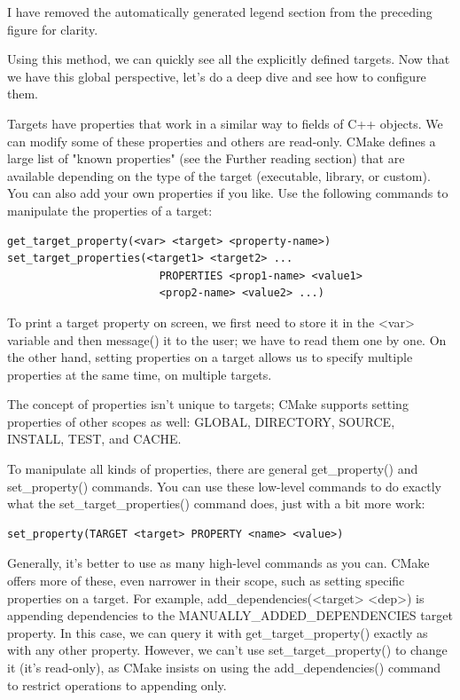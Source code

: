 I have removed the automatically generated legend section from the preceding figure for clarity.

Using this method, we can quickly see all the explicitly defined targets. Now that we have this global perspective, let's do a deep dive and see how to configure them.
 

Targets have properties that work in a similar way to fields of C++ objects. We can modify some of these properties and others are read-only. CMake defines a large list of "known properties" (see the Further reading section) that are available depending on the type of the target (executable, library, or custom). You can also add your own properties if you like. Use the following commands to manipulate the properties of a target:

\begin{lstlisting}[style=styleCMake]
get_target_property(<var> <target> <property-name>)
set_target_properties(<target1> <target2> ...
						PROPERTIES <prop1-name> <value1>
						<prop2-name> <value2> ...)
\end{lstlisting}

To print a target property on screen, we first need to store it in the <var> variable and then message() it to the user; we have to read them one by one. On the other hand, setting properties on a target allows us to specify multiple properties at the same time, on multiple targets.

The concept of properties isn't unique to targets; CMake supports setting properties of other scopes as well: GLOBAL, DIRECTORY, SOURCE, INSTALL, TEST, and CACHE.

To manipulate all kinds of properties, there are general get\_property() and set\_property() commands. You can use these low-level commands to do exactly what the set\_target\_properties() command does, just with a bit more work:

\begin{lstlisting}[style=styleCMake]
set_property(TARGET <target> PROPERTY <name> <value>)
\end{lstlisting}

Generally, it's better to use as many high-level commands as you can. CMake offers more of these, even narrower in their scope, such as setting specific properties on a target. For example, add\_dependencies(<target> <dep>) is appending dependencies to the MANUALLY\_ADDED\_DEPENDENCIES target property. In this case, we can query it with get\_target\_property() exactly as with any other property. However, we can't use set\_target\_property() to change it (it's read-only), as CMake insists on using the add\_dependencies() command to restrict operations to appending only.

